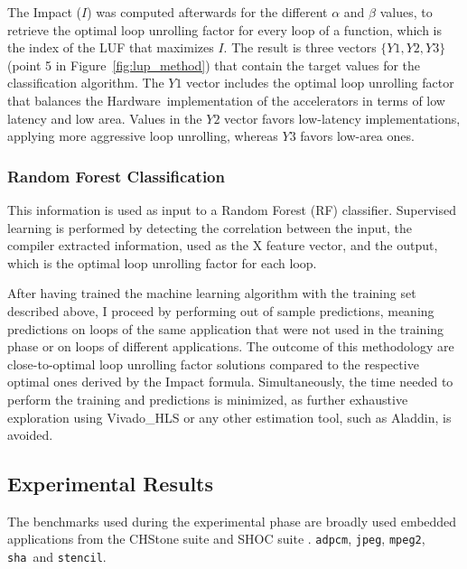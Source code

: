 \documentclass[]{usiinfthesis}
\newcommand{\HW}{{Hardware}}
\newcommand{\adpcm}{\texttt{adpcm}}
\newcommand{\sha}{\texttt{sha}}
\newcommand{\jpeg}{\texttt{jpeg}}
\newcommand{\mpeg}{\texttt{mpeg2}}
\newcommand{\stencil}{\texttt{stencil}}
\begin{document}
The Impact ($I$) was computed afterwards for the different $\alpha$
and $\beta$ values, to retrieve the optimal loop unrolling factor for every loop
of a function, which is the index of the LUF that maximizes $I$. The
result is three vectors $\{Y1,Y2,Y3\}$ (point 5 in
Figure~\ref{fig:lup_method}) that contain the target values for the
classification algorithm. The $Y1$ vector includes the optimal loop
unrolling factor that balances the \HW\ implementation of the
accelerators in terms of low latency and low area. Values in the $Y2$
vector favors low-latency implementations, applying more aggressive
loop unrolling, whereas $Y3$ favors low-area ones.


\subsubsection{Random Forest Classification}

This information is used as input to a
Random Forest (RF) classifier.
Supervised learning is performed by detecting the correlation between 
the input, the compiler extracted information, used as the X feature vector, and the output, which is the optimal 
loop unrolling factor for each loop.\par 
After having trained the machine learning algorithm with the training set described above, I 
proceed by performing out of sample
predictions, meaning predictions on loops of the same application that were not used in the training 
phase or on loops of different applications. The outcome of this methodology are
close-to-optimal loop unrolling factor solutions compared to the respective optimal ones derived by 
the Impact formula.
Simultaneously, the time needed to perform the training and predictions is minimized, as
further exhaustive exploration using Vivado\_HLS or any other estimation tool, such as Aladdin, is avoided.\par

\subsection{Experimental Results}
\label{sec:ml_exp}

The benchmarks used during the experimental phase are broadly used embedded applications from 
the CHStone suite \cite{HaraMay08} and SHOC suite \cite{danalis2010scalable}.
 \adpcm, \jpeg, \mpeg, \sha\ and \stencil.\par
\end{document}
